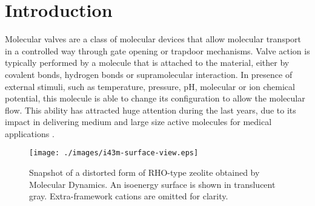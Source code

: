 \section{Introduction}
Molecular valves are a class of molecular devices that allow molecular transport in a controlled way through gate opening or trapdoor mechanisms. Valve action is typically performed by a molecule that is attached to the material, either by covalent bonds, hydrogen bonds or supramolecular interaction. In presence of external stimuli, such as temperature, pressure, pH, molecular or ion chemical potential, this molecule is able to change its configuration to allow the molecular flow. This ability has attracted huge attention during the last years, due to its impact in delivering medium and large size active molecules for medical applications \cite{mengvalve2010,C1MD00158B,doi:10.1021/nn3018365,doi:10.1021/nn101499d}.
\begin{figure}[!htpb]
  \centering
  \texttt{[image: ./images/i43m-surface-view.eps]}
  \caption{\label{fig:i43m}Snapshot of a distorted form of RHO-type zeolite obtained by Molecular Dynamics. An isoenergy surface is shown in translucent gray. Extra-framework cations are omitted for clarity.
  }
\end{figure}

\lipsum[12-40]
